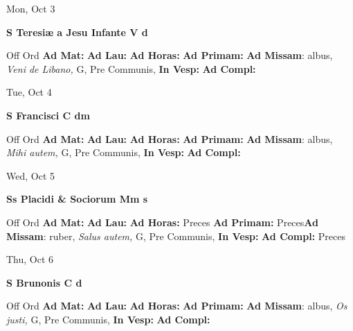 \documentclass[10pt]{memoir}
\begin{document}
\begin{center}
\begin{minipage}{3.5in}
\vspace{2em}
\begin{center}Mon, Oct 3
\end{center}
\textbf{ \large S Teresiæ a Jesu Infante V
\textnormal{\normalsize d}}

\begin{justify}Off Ord
\textbf{Ad Mat: }
\textbf{Ad Lau: }
\textbf{Ad Horas: }
\textbf{Ad Primam: }\textbf{Ad Missam}: albus, \textit{Veni de Libano,} G, Pre Communis, 
\textbf{In Vesp: }
\textbf{Ad Compl: }
\end{justify}
\end{minipage}
\end{center}

\begin{center}
\begin{minipage}{3.5in}
\vspace{2em}
\begin{center}Tue, Oct 4
\end{center}
\textbf{ \large S Francisci C
\textnormal{\normalsize dm}}

\begin{justify}Off Ord
\textbf{Ad Mat: }
\textbf{Ad Lau: }
\textbf{Ad Horas: }
\textbf{Ad Primam: }\textbf{Ad Missam}: albus, \textit{Mihi autem,} G, Pre Communis, 
\textbf{In Vesp: }
\textbf{Ad Compl: }
\end{justify}
\end{minipage}
\end{center}

\begin{center}
\begin{minipage}{3.5in}
\vspace{2em}
\begin{center}Wed, Oct 5
\end{center}
\textbf{ \large Ss Placidi \& Sociorum Mm
\textnormal{\normalsize s}}

\begin{justify}Off Ord
\textbf{Ad Mat: }
\textbf{Ad Lau: }
\textbf{Ad Horas: }Preces
\textbf{Ad Primam: }Preces\textbf{Ad Missam}: ruber, \textit{Salus autem,} G, Pre Communis, 
\textbf{In Vesp: }
\textbf{Ad Compl: }Preces
\end{justify}
\end{minipage}
\end{center}

\begin{center}
\begin{minipage}{3.5in}
\vspace{2em}
\begin{center}Thu, Oct 6
\end{center}
\textbf{ \large S Brunonis C
\textnormal{\normalsize d}}

\begin{justify}Off Ord
\textbf{Ad Mat: }
\textbf{Ad Lau: }
\textbf{Ad Horas: }
\textbf{Ad Primam: }\textbf{Ad Missam}: albus, \textit{Os justi,} G, Pre Communis, 
\textbf{In Vesp: }
\textbf{Ad Compl: }
\end{justify}
\end{minipage}
\end{center}
\end{document}
